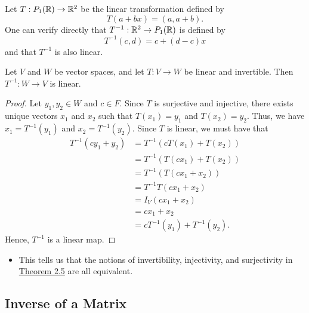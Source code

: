 \begin{eg}
    Let \( T: {P}_{1}(\mathbb{R}) \to \mathbb{R}^{2}  \) be the linear transformation defined by
    \[  T(a+bx) = (a, a+b). \]
    One can verify directly that \( T^{-1}: \mathbb{R}^{2} \to {P}_{1}(\mathbb{R}) \) is defined by 
    \[  T^{-1}(c,d) = c + (d-c)x \]
    and that \( T^{-1} \) is also linear.
\end{eg}

\begin{theorem}
    Let \( V  \) and \( W  \) be vector spaces, and let \( T: V \to W  \) be linear and invertible. Then \( T^{-1}: W \to V  \) is linear.
\end{theorem}
\begin{proof}
Let \( {y}_{1}, {y}_{2} \in W  \) and \( c \in F  \). Since \( T  \) is surjective and injective, there exists unique vectors \( {x}_{1}  \) and \( {x}_{2}  \) such that \( T({x}_{1}) = {y}_{1}  \) and \( T({x}_{2}) = {y}_{2} \). Thus, we have \( {x}_{1} = T^{-1}({y}_{1})  \) and \( {x}_{2} = T^{-1}({y}_{2}) \). Since \( T  \) is linear, we must have that
\begin{align*}
    T^{-1}( c {y}_{1} + {y}_{2}) &= T^{-1}( c T({x}_{1}) + T({x}_{2})) \\
                                 &= T^{-1}( T(c {x}_{1}) + T({x}_{2})) \\
                                 &= T^{-1}(T({cx}_{1} + {x}_{2})) \\
                                 &= T^{-1}T({cx}_{1} + {x}_{2}) \\
                                 &= {I}_{V}({cx}_{1} + {x}_{2}) \\
                                 &= {cx}_{1} + {x}_{2} \\
                                 &= c T^{-1}({y}_{1}) + T^{-1}({y}_{2}).
\end{align*}
Hence, \( T^{-1} \) is a linear map.
\end{proof}

\begin{itemize}
    \item This tells us that the notions of invertibility, injectivity, and surjectivity in {\hyperref[Theorem 2.5]{Theorem 2.5}} are all equivalent. 
\end{itemize}

\subsection{Inverse of a Matrix}

